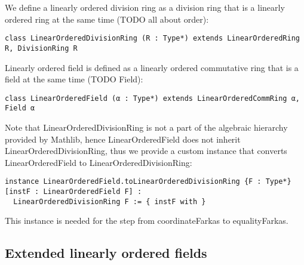 \documentclass[]{article}
\renewcommand{\.}{\hskip .75pt}
\begin{document}
We define a linearly ordered division ring as a division ring that is a linearly ordered ring at the same time (TODO all about order):
\begin{lstlisting}
class LinearOrderedDivisionRing (R : Type*) extends LinearOrderedRing R, DivisionRing R
\end{lstlisting}
Linearly ordered field is defined as a linearly ordered commutative ring that is a field at the same time (TODO Field):
\begin{lstlisting}
class LinearOrderedField (α : Type*) extends LinearOrderedCommRing α, Field α
\end{lstlisting}
Note that LinearOrderedDivisionRing is not a part of the algebraic hierarchy provided by Mathlib,
hence LinearOrderedField does not inherit LinearOrderedDivisionRing, thus we provide a custom
instance that converts LinearOrderedField to LinearOrderedDivisionRing:
\begin{lstlisting}
instance LinearOrderedField.toLinearOrderedDivisionRing {F : Type*} [instF : LinearOrderedField F] :
  LinearOrderedDivisionRing F := { instF with }
\end{lstlisting}
This instance is needed for the step from coordinateFarkas to equalityFarkas.

\subsection{Extended linearly ordered fields}
\end{document}

